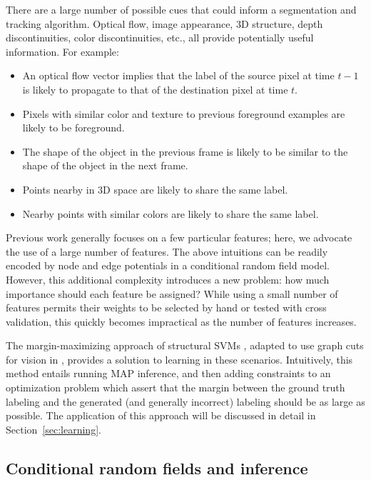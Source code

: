 \documentclass[graybox]{svmult}
\begin{document}
There are a large number of possible cues that could inform a segmentation and tracking algorithm.  Optical flow, image appearance, 3D structure, depth discontinuities, color discontinuities, etc., all provide potentially useful information.  For example:
\begin{itemize}
  \item An optical flow vector implies that the label of the source pixel at time $t-1$ is likely to propagate to that of the destination pixel at time $t$.
\item Pixels with similar color and texture to previous foreground examples are likely to be foreground.
\item The shape of the object in the previous frame is likely to be similar to the shape of the object in the next frame.
\item Points nearby in 3D space are likely to share the same label.
\item Nearby points with similar colors are likely to share the same label.
\end{itemize}

Previous work generally focuses on a few particular features; here, we advocate the use of a large number of features.  The above intuitions can be readily encoded by node and edge potentials in a conditional random field model.  However, this additional complexity introduces a new problem: how much importance should each feature be assigned?  While using a small number of features permits their weights to be selected by hand or tested with cross validation, this quickly becomes impractical as the number of features increases.

The margin-maximizing approach of structural SVMs \cite{taskar2005a, tsochantaridis2005a}, adapted to use graph cuts for vision in \cite{szummer2008a}, provides a solution to learning in these scenarios.  Intuitively, this method entails running MAP inference, and then adding constraints to an optimization problem which assert that the margin between the ground truth labeling and the generated (and generally incorrect) labeling should be as large as possible.  The application of this approach will be discussed in detail in Section~\ref{sec:learning}.


\subsection{Conditional random fields and inference}
\label{sec:inference}
\end{document}
